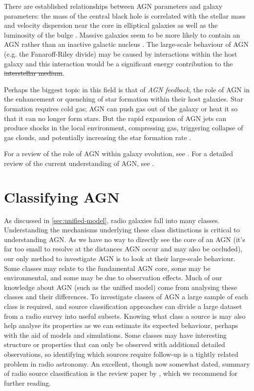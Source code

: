 \documentclass[11pt, a4paper]{book}
\newcommand{\defn}[1]{\emph{#1}}
\providecommand{\DIFaddtex}[1]{{\protect\color{blue}\uwave{#1}}} %
\providecommand{\DIFdeltex}[1]{{\protect\color{red}\sout{#1}}}                      %
\providecommand{\DIFaddbegin}{} %
\providecommand{\DIFaddend}{} %
\providecommand{\DIFdelbegin}{} %
\providecommand{\DIFdelend}{} %
\providecommand{\DIFadd}[1]{\texorpdfstring{\DIFaddtex{#1}}{#1}} %
\providecommand{\DIFdel}[1]{\texorpdfstring{\DIFdeltex{#1}}{}} %
\newcommand{\DIFscaledelfig}{0.5}
\newlength{\DIFdelgraphicswidth} %
\newlength{\DIFdelgraphicsheight} %
\newcommand{\DIFaddincludegraphics}[2][]{{\color{blue}\fbox{\DIFOincludegraphics[#1]{#2}}}} %
\newcommand{\DIFdelincludegraphics}[2][]{%
\sbox{\DIFdelgraphicsbox}{\DIFOincludegraphics[#1]{#2}}%
\settoboxwidth{\DIFdelgraphicswidth}{\DIFdelgraphicsbox} %
\settoboxtotalheight{\DIFdelgraphicsheight}{\DIFdelgraphicsbox} %
\scalebox{\DIFscaledelfig}{%
\parbox[b]{\DIFdelgraphicswidth}{\usebox{\DIFdelgraphicsbox}\\[-\baselineskip] \rule{\DIFdelgraphicswidth}{0em}}\llap{\resizebox{\DIFdelgraphicswidth}{\DIFdelgraphicsheight}{%
\setlength{\unitlength}{\DIFdelgraphicswidth}%
\begin{picture}(1,1)%
\thicklines\linethickness{2pt} %
{\color[rgb]{1,0,0}\put(0,0){\framebox(1,1){}}}%
{\color[rgb]{1,0,0}\put(0,0){\line( 1,1){1}}}%
{\color[rgb]{1,0,0}\put(0,1){\line(1,-1){1}}}%
\end{picture}%
}\hspace*{3pt}}} %
} %
\DeclareRobustCommand{\DIFaddbegin}{\DIFOaddbegin \let\includegraphics\DIFaddincludegraphics} %
\DeclareRobustCommand{\DIFaddend}{\DIFOaddend \let\includegraphics\DIFOincludegraphics} %
\DeclareRobustCommand{\DIFdelbegin}{\DIFOdelbegin \let\includegraphics\DIFdelincludegraphics} %
\DeclareRobustCommand{\DIFdelend}{\DIFOaddend \let\includegraphics\DIFOincludegraphics} %
\begin{document}
        There are established relationships between AGN parameters and galaxy parameters: the mass of the central black hole is correlated with the stellar mass and velocity dispersion near the core in elliptical galaxies \citep{cattaneo_role_2009} as well as the luminosity of the bulge \citep{kormendy_inward_1995}. Massive galaxies seem to be more likely to contain an AGN rather than an inactive galactic nucleus \citep{hardcastle20feedback}. The large-scale behaviour of AGN (e.g. the Fanaroff-Riley divide) may be caused by interactions within the host galaxy \citep{hardcastle20feedback} and this interaction would be a significant energy contribution to the \DIFdelbegin \DIFdel{interstellar medium}\DIFdelend \DIFaddbegin \DIFadd{ISM}\DIFaddend .

        Perhaps the biggest topic in this field is that of \defn{AGN feedback}, the role of AGN in the enhancement or quenching of star formation within their host galaxies. Star formation requires cold gas; AGN can push gas out of the galaxy \citep{zubovas_clearing_2012} or heat it so that it can no longer form stars. But the rapid expansion of AGN jets can produce shocks in the local environment, compressing gas, triggering collapse of gas clouds, and potentially increasing the star formation rate \citep{zubovas_collapse_2014}.

        For a review of the role of AGN within galaxy evolution, see \citet{kormendy_coevolution_2013}. For a detailed review of the current understanding of AGN, see \citet{hardcastle20feedback}.

\section{Classifying AGN}
\label{sec:classification-of-agn}

    As discussed in \autoref{sec:unified-model}, radio galaxies fall into many classes. Understanding the mechanisms underlying these class distinctions is critical to understanding AGN. As we have no way to directly see the core of an AGN (it's far too small to resolve at the distances AGN occur and may also be occluded), our only method to investigate AGN is to look at their large-scale behaviour. Some classes may relate to the fundamental AGN core, some may be environmental, and some may be due to observation effects. Much of our knowledge about AGN (such as the unified model) come from analysing these classes and their differences. To investigate classes of AGN a large sample of each class is required, and source classification approaches can divide a large dataset from a radio survey into useful subsets. Knowing what class a source is may also help analyse its properties as we can estimate its expected behaviour, perhaps with the aid of models and simulations. Some classes may have interesting structure or properties that can only be observed with additional detailed observations, so identifying which sources require follow-up is a tightly related problem in radio astronomy. An excellent, though now somewhat dated, summary of radio source classification is the review paper by \citet{urry95unified}, which we recommend for further reading.
\end{document}
